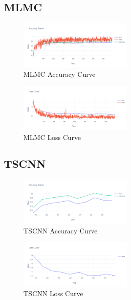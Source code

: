 \documentclass[conference]{IEEEtran}
\begin{document}
\subsection{MLMC}

\begin{figure}[h]
    \centering
    \includegraphics[width=0.5\textwidth]{images/MLMC_accuracy.png}
    \caption{MLMC Accuracy Curve}
    \label{fig:MLMC_accuracy}
\end{figure}{}

\begin{figure}[h]
    \centering
    \includegraphics[width=0.5\textwidth]{images/MLMC_loss.png}
    \caption{MLMC Loss Curve}
    \label{fig:MLMC_loss}
\end{figure}{}

\subsection{TSCNN}

\begin{figure}[h]
    \centering
    \includegraphics[width=0.5\textwidth]{images/TSCNN_accuracy.png}
    \caption{TSCNN Accuracy Curve}
    \label{fig:TSCNN_accuracy}
\end{figure}{}

\begin{figure}[h]
    \centering
    \includegraphics[width=0.5\textwidth]{images/TSCNN_loss.png}
    \caption{TSCNN Loss Curve}
    \label{fig:TSCNN_loss}
\end{figure}{}
\end{document}
